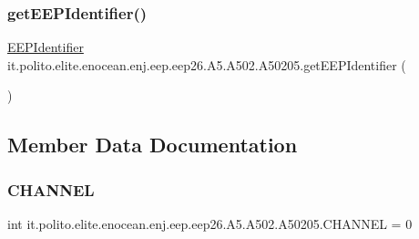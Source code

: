 \subsubsection{\texorpdfstring{get\+E\+E\+P\+Identifier()}{getEEPIdentifier()}}
{\footnotesize\ttfamily \hyperlink{classit_1_1polito_1_1elite_1_1enocean_1_1enj_1_1eep_1_1_e_e_p_identifier}{E\+E\+P\+Identifier} it.\+polito.\+elite.\+enocean.\+enj.\+eep.\+eep26.\+A5.\+A502.\+A50205.\+get\+E\+E\+P\+Identifier (\begin{DoxyParamCaption}{ }\end{DoxyParamCaption})}



\subsection{Member Data Documentation}
\hypertarget{classit_1_1polito_1_1elite_1_1enocean_1_1enj_1_1eep_1_1eep26_1_1_a5_1_1_a502_1_1_a50205_adc9305fee441b508ddf8a06c34bd79c2}{}\label{classit_1_1polito_1_1elite_1_1enocean_1_1enj_1_1eep_1_1eep26_1_1_a5_1_1_a502_1_1_a50205_adc9305fee441b508ddf8a06c34bd79c2} 
\subsubsection{\texorpdfstring{C\+H\+A\+N\+N\+EL}{CHANNEL}}
{\footnotesize\ttfamily int it.\+polito.\+elite.\+enocean.\+enj.\+eep.\+eep26.\+A5.\+A502.\+A50205.\+C\+H\+A\+N\+N\+EL = 0\hspace{0.3cm}{\ttfamily [static]}}

\hypertarget{classit_1_1polito_1_1elite_1_1enocean_1_1enj_1_1eep_1_1eep26_1_1_a5_1_1_a502_1_1_a50205_a68ceec62d912505f59a74513ce819e6f}{}\label{classit_1_1polito_1_1elite_1_1enocean_1_1enj_1_1eep_1_1eep26_1_1_a5_1_1_a502_1_1_a50205_a68ceec62d912505f59a74513ce819e6f} 
